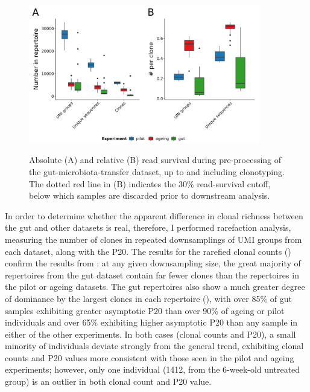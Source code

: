 \begin{figure}
\centering
\includegraphics[width = 0.9\textwidth]{_Figures/png/igseq-comparative-metrics}
\begin{subfigure}{0em}
\label{fig:igseq-comparative-metrics-abs}
\end{subfigure}
\begin{subfigure}{0em}
\label{fig:igseq-comparative-metrics-rel}
\end{subfigure}
\caption{Absolute (A) and relative (B) read survival during pre-processing of the \igseq gut-microbiota-transfer dataset, up to and including clonotyping. The dotted red line in (B) indicates the 30\% read-survival cutoff, below which samples are discarded prior to downstream analysis.}
\label{fig:igseq-comparative-metrics}
\end{figure}

In order to determine whether the apparent difference in clonal richness between the gut and other datasets is real, therefore, I performed rarefaction analysis, measuring the number of clones in repeated downsamplings of UMI groups from each dataset, along with the P20. The results for the rarefied clonal counts () confirm the results from : at any given downsampling size, the great majority of repertoires from the gut dataset contain far fewer clones than the repertoires in the pilot or ageing datasets. The gut repertoires also show a much greater degree of dominance by the largest clones in each repertoire (), with over 85\% of gut samples exhibiting greater asymptotic P20 than over 90\% of ageing or pilot individuals and over 65\% exhibiting higher asymptotic P20 than any sample in either of the other experiments. In both cases (clonal counts and P20), a small minority of individuals deviate strongly from the general trend, exhibiting clonal counts and P20 values more consistent with those seen in the pilot and ageing experiments; however, only one individual (1412, from the 6-week-old untreated group) is an outlier in both clonal count and P20 value.

